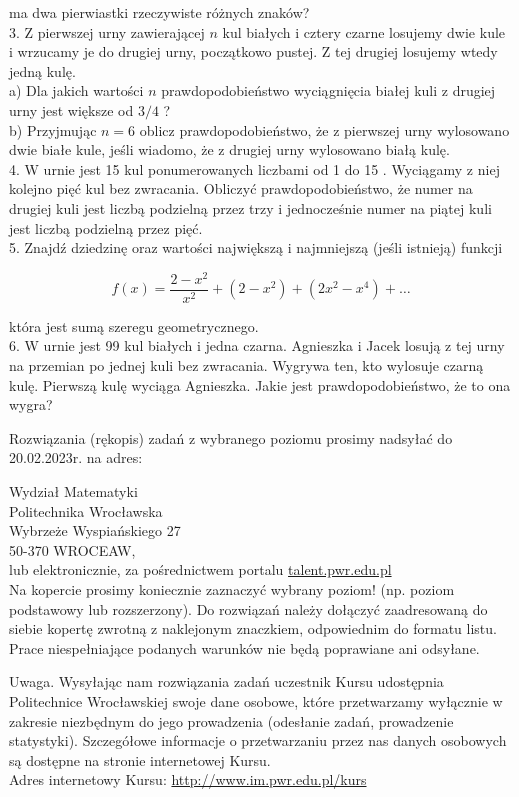 \documentclass[10pt]{article}
\begin{document}
ma dwa pierwiastki rzeczywiste różnych znaków?\\
3. Z pierwszej urny zawierającej $n$ kul białych i cztery czarne losujemy dwie kule i wrzucamy je do drugiej urny, początkowo pustej. Z tej drugiej losujemy wtedy jedną kulę.\\
a) Dla jakich wartości $n$ prawdopodobieństwo wyciągnięcia białej kuli z drugiej urny jest większe od $3 / 4$ ?\\
b) Przyjmując $n=6$ oblicz prawdopodobieństwo, że z pierwszej urny wylosowano dwie białe kule, jeśli wiadomo, że z drugiej urny wylosowano białą kulę.\\
4. W urnie jest 15 kul ponumerowanych liczbami od 1 do 15 . Wyciągamy z niej kolejno pięć kul bez zwracania. Obliczyć prawdopodobieństwo, że numer na drugiej kuli jest liczbą podzielną przez trzy i jednocześnie numer na piątej kuli jest liczbą podzielną przez pięć.\\
5. Znajdź dziedzinę oraz wartości największą i najmniejszą (jeśli istnieją) funkcji

$$
f(x)=\frac{2-x^{2}}{x^{2}}+\left(2-x^{2}\right)+\left(2 x^{2}-x^{4}\right)+\ldots
$$

która jest sumą szeregu geometrycznego.\\
6. W urnie jest 99 kul białych i jedna czarna. Agnieszka i Jacek losują z tej urny na przemian po jednej kuli bez zwracania. Wygrywa ten, kto wylosuje czarną kulę. Pierwszą kulę wyciąga Agnieszka. Jakie jest prawdopodobieństwo, że to ona wygra?

Rozwiązania (rękopis) zadań z wybranego poziomu prosimy nadsyłać do 20.02.2023r. na adres:

Wydział Matematyki\\
Politechnika Wrocławska\\
Wybrzeże Wyspiańskiego 27\\
50-370 WROCEAW,\\
lub elektronicznie, za pośrednictwem portalu \href{http://talent.pwr.edu.pl}{talent.pwr.edu.pl}\\
Na kopercie prosimy koniecznie zaznaczyć wybrany poziom! (np. poziom podstawowy lub rozszerzony). Do rozwiązań należy dołączyć zaadresowaną do siebie kopertę zwrotną z naklejonym znaczkiem, odpowiednim do formatu listu. Prace niespełniające podanych warunków nie będą poprawiane ani odsyłane.

Uwaga. Wysyłając nam rozwiązania zadań uczestnik Kursu udostępnia Politechnice Wrocławskiej swoje dane osobowe, które przetwarzamy wyłącznie w zakresie niezbędnym do jego prowadzenia (odesłanie zadań, prowadzenie statystyki). Szczegółowe informacje o przetwarzaniu przez nas danych osobowych są dostępne na stronie internetowej Kursu.\\
Adres internetowy Kursu: \href{http://www.im.pwr.edu.pl/kurs}{http://www.im.pwr.edu.pl/kurs}
\end{document}
